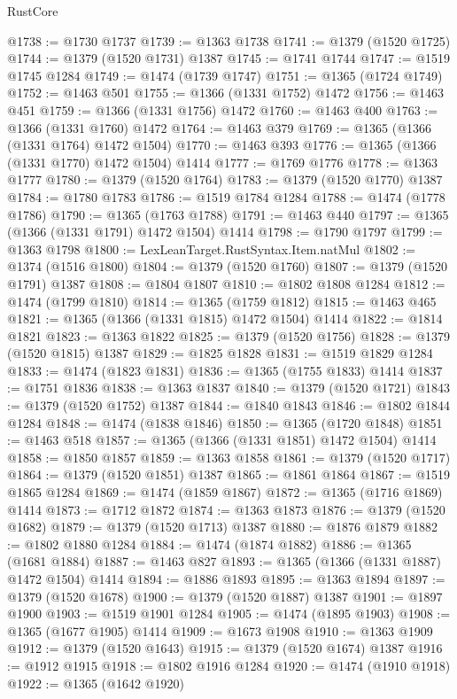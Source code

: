 \begin{lexlean}{RustCore}
\begin{coremodule}
@1738 := @1730 @1737
@1739 := @1363 @1738
@1741 := @1379 (@1520 @1725)
@1744 := @1379 (@1520 @1731) @1387
@1745 := @1741 @1744
@1747 := @1519 @1745 @1284
@1749 := @1474 (@1739 @1747)
@1751 := @1365 (@1724 @1749)
@1752 := @1463 @501
@1755 := @1366 (@1331 @1752) @1472
@1756 := @1463 @451
@1759 := @1366 (@1331 @1756) @1472
@1760 := @1463 @400
@1763 := @1366 (@1331 @1760) @1472
@1764 := @1463 @379
@1769 := @1365 (@1366 (@1331 @1764) @1472 @1504)
@1770 := @1463 @393
@1776 := @1365 (@1366 (@1331 @1770) @1472 @1504) @1414
@1777 := @1769 @1776
@1778 := @1363 @1777
@1780 := @1379 (@1520 @1764)
@1783 := @1379 (@1520 @1770) @1387
@1784 := @1780 @1783
@1786 := @1519 @1784 @1284
@1788 := @1474 (@1778 @1786)
@1790 := @1365 (@1763 @1788)
@1791 := @1463 @440
@1797 := @1365 (@1366 (@1331 @1791) @1472 @1504) @1414
@1798 := @1790 @1797
@1799 := @1363 @1798
@1800 := LexLeanTarget.RustSyntax.Item.natMul
@1802 := @1374 (@1516 @1800)
@1804 := @1379 (@1520 @1760)
@1807 := @1379 (@1520 @1791) @1387
@1808 := @1804 @1807
@1810 := @1802 @1808 @1284
@1812 := @1474 (@1799 @1810)
@1814 := @1365 (@1759 @1812)
@1815 := @1463 @465
@1821 := @1365 (@1366 (@1331 @1815) @1472 @1504) @1414
@1822 := @1814 @1821
@1823 := @1363 @1822
@1825 := @1379 (@1520 @1756)
@1828 := @1379 (@1520 @1815) @1387
@1829 := @1825 @1828
@1831 := @1519 @1829 @1284
@1833 := @1474 (@1823 @1831)
@1836 := @1365 (@1755 @1833) @1414
@1837 := @1751 @1836
@1838 := @1363 @1837
@1840 := @1379 (@1520 @1721)
@1843 := @1379 (@1520 @1752) @1387
@1844 := @1840 @1843
@1846 := @1802 @1844 @1284
@1848 := @1474 (@1838 @1846)
@1850 := @1365 (@1720 @1848)
@1851 := @1463 @518
@1857 := @1365 (@1366 (@1331 @1851) @1472 @1504) @1414
@1858 := @1850 @1857
@1859 := @1363 @1858
@1861 := @1379 (@1520 @1717)
@1864 := @1379 (@1520 @1851) @1387
@1865 := @1861 @1864
@1867 := @1519 @1865 @1284
@1869 := @1474 (@1859 @1867)
@1872 := @1365 (@1716 @1869) @1414
@1873 := @1712 @1872
@1874 := @1363 @1873
@1876 := @1379 (@1520 @1682)
@1879 := @1379 (@1520 @1713) @1387
@1880 := @1876 @1879
@1882 := @1802 @1880 @1284
@1884 := @1474 (@1874 @1882)
@1886 := @1365 (@1681 @1884)
@1887 := @1463 @827
@1893 := @1365 (@1366 (@1331 @1887) @1472 @1504) @1414
@1894 := @1886 @1893
@1895 := @1363 @1894
@1897 := @1379 (@1520 @1678)
@1900 := @1379 (@1520 @1887) @1387
@1901 := @1897 @1900
@1903 := @1519 @1901 @1284
@1905 := @1474 (@1895 @1903)
@1908 := @1365 (@1677 @1905) @1414
@1909 := @1673 @1908
@1910 := @1363 @1909
@1912 := @1379 (@1520 @1643)
@1915 := @1379 (@1520 @1674) @1387
@1916 := @1912 @1915
@1918 := @1802 @1916 @1284
@1920 := @1474 (@1910 @1918)
@1922 := @1365 (@1642 @1920)

\end{coremodule}
\end{lexlean}
